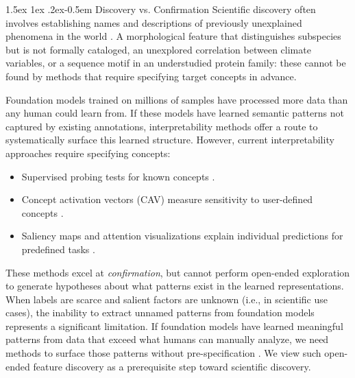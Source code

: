 \documentclass[10pt,twocolumn,letterpaper]{article}
\makeatletter
\renewcommand{\paragraph}{%
  \@startsection{paragraph}{4}%
  {\z@}{1.5ex \@plus 1ex \@minus .2ex}{-0.5em}%
  {\normalfont\normalsize\bfseries}%
}
\makeatother
\begin{document}
\paragraph{Discovery vs. Confirmation}
Scientific discovery often involves establishing names and descriptions of previously unexplained phenomena in the world \citep{kuhn1970structure}.
A morphological feature that distinguishes subspecies but is not formally cataloged, an unexplored correlation between climate variables, or a sequence motif in an understudied protein family: these cannot be found by methods that require specifying target concepts in advance.

Foundation models trained on millions of samples have processed more data than any human could learn from.
If these models have learned semantic patterns not captured by existing annotations, interpretability methods offer a route to systematically surface this learned structure.
However, current interpretability approaches require specifying concepts:
\begin{itemize}
\item{Supervised probing tests for known concepts \citep{alain2016understanding}.}
\item{Concept activation vectors (CAV) measure sensitivity to user-defined concepts \citep{kim2018tcav}.}
\item{Saliency maps and attention visualizations explain individual predictions for predefined tasks \citep{selvaraju2017gradcam,sundararajan2017axiomatic,simonyan2013deep}.}
\end{itemize}
These methods excel at \textit{confirmation}, but cannot perform open-ended exploration to generate hypotheses about what patterns exist in the learned representations.
When labels are scarce and salient factors are unknown (i.e., in scientific use cases), the inability to extract unnamed patterns from foundation models represents a significant limitation.
If foundation models have learned meaningful patterns from data that exceed what humans can manually analyze, we need methods to surface those patterns without pre-specification \citep{hughes2024open}.
We view such open-ended feature discovery as a prerequisite step toward scientific discovery.
\end{document}
